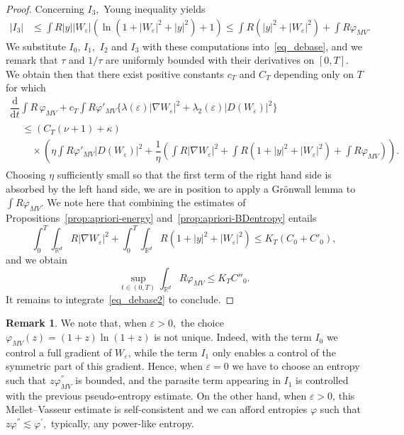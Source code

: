 \documentclass[10pt]{amsart}
\theoremstyle{definition}\newtheorem{defi}[theo]{Definition}\newtheorem{rema}[theo]{Remark}\newtheorem{exam}[theo]{Example}\newtheorem{exem}[theo]{Example}\newtheorem{nota}[theo]{Notation}
\newcommand*\R{\mathbb{R}}
\newcommand*\dd {\mathrm{d}}
\newcommand*\<{\left\langle}
\renewcommand*\>{\right\rangle}
\renewcommand*\le{\leqslant}
\newcommand*\eps{\varepsilon}
\begin{document}
\begin{proof}
Concerning $I_3,$ Young inequality yields
\begin{align*}
|I_3| & \le \int R |y| |W_\eps| \left(\ln\left(1+|W_\eps|^2 + |y|^2\right) + 1\right)
\le \int R \left(|y|^2 + |W_\eps|^2\right) + \int R \varphi_{MV}.
\end{align*}
We substitute $I_0$, $I_1,$ $I_2$ and $I_3$ with these computations into~\eqref{eq_debase}, and we remark that $\tau$ and $1/\tau$ are uniformly bounded with their derivatives on $[0,T].$ We obtain then that there exist positive constants $c_{T}$ and $C_T$ depending only on $T$ for which
\begin{multline}\label{eq_debase2}
\dfrac{\dd }{\dd t}\int R \, \varphi_{MV} + c_T \int R \varphi'_{MV} \{ \lambda(\eps) |\nabla W_\eps|^2 + \lambda_2(\eps) |D(W_\eps)|^2 \}\\
\begin{aligned}
&\le \left(C_T(\nu +1) + \kappa\right) \\
&\quad\times\!\left(\eta\!\int\! R \varphi'_{MV}|D(W_\eps)|^2 +
\dfrac{1}{\eta} \left(\int\! R|\nabla W_\eps|^2 + \int\! R(1+|y|^2 +|W_\eps|^2) + \int\! R \varphi_{MV} \right) \right)\!.
\end{aligned}
\end{multline}
Choosing $\eta$ sufficiently small so that the first term of the right hand side is absorbed by the left hand side, we are in position to apply a Gr\"onwall lemma to $\int R \varphi_{MV}.$ We note here that combining the estimates of Propositions~\ref{prop:apriori-energy} and~\ref{prop:apriori-BDentropy} entails
\[
\int_0^T \!\int_{\R^d} R |\nabla W_\eps|^2 + \int_0^T \! \int_{\R^d} R(1 +|y|^2 + |W_\eps|^2) \le K_T (C_0 + C'_0),
\]
and we obtain
\[
\sup_{t \in (0,T)} \int_{\R^d} R \varphi_{MV} \le K_T C''_0.
\]
It remains to integrate~\eqref{eq_debase2} to conclude.
\end{proof}

\begin{rema}
We note that, when $\varepsilon >0,$ the choice $\varphi_{MV}(z) = (1+z)\ln(1+z)$ is not unique. Indeed, with the term $I_0$ we control a full gradient of $W_{\varepsilon}$, while the term $I_1$ only enables a control of the symmetric part of this gradient. Hence, when $\varepsilon =0$ we have to choose an entropy such that $z
\varphi^{''}_{MV}$ is bounded, and the parasite term appearing in $I_1$ is controlled with the previous pseudo-entropy estimate. On the other hand, when $\varepsilon >0$, this Mellet--Vasseur estimate is self-consistent and we can afford entropies $\varphi$ such that $z \varphi^{''} \lesssim \varphi^{'},$ typically, any power-like entropy.
\end{rema}
\end{document}
